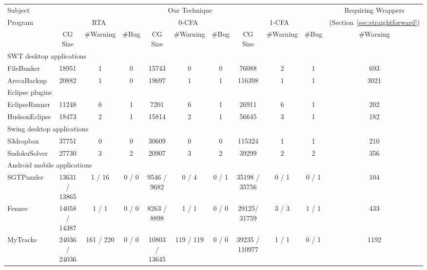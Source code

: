 \begin{table}[ht]
\begin{center}
 \fontsize{9pt}{\baselineskip}\selectfont
\hspace*{-0.2cm}
\setlength{\tabcolsep}{.14\tabcolsep}
\begin{tabular}{|l||c|c|c||c|c|c||c|c|c||c|}
\hline
 Subject&  \multicolumn{9}{|c||}{Our Technique} & Requiring Wrappers  \\
\cline{2-10}
 Program  &  \multicolumn{3}{|c||}{RTA }& \multicolumn{3}{|c||}{0-CFA } & \multicolumn{3}{|c||}{1-CFA } & (Section~\ref{sec:straightforward})  \\
\cline{2-11}
 & CG Size & \#Warning & \#Bug & CG Size & \#Warning & \#Bug & CG Size & \#Warning & \#Bug & \#Warning \\
\hline \hline
\multicolumn{11}{|l|}{SWT desktop applications}   \\
 \hline
 FileBunker &  18951 &  1 &  0 & 15743 & 0 & 0 & 76088 & 2 & 1& 693  \\
 \hline
 ArecaBackup&  20882 &  1  &  0 & 19697 & 1 & 1  & 116398 & 1 & 1 & 3021\\
 \hline
 \hline
\multicolumn{11}{|l|}{Eclipse plugins}   \\
 \hline
 EclipseRunner&  11248&  6 &  1 & 7201 & 6 & 1 & 26911 & 6 & 1& 202  \\
 \hline
 HudsonEclipse& 18473 &  2 &  1 & 15814 & 2 & 1& 56645 & 3 & 1 & 182 \\
 \hline
 \hline
\multicolumn{11}{|l|}{Swing desktop applications}   \\
 \hline
 S3dropbox & 37751 &  0 &  0 & 30609 & 0 & 0 & 115324 & 1 & 1 & 210  \\
 \hline
  SudokuSolver&  27730&  3 &  2 & 20907 & 3 & 2 & 39299 & 2 & 2 & 356  \\
 \hline
 \hline
\multicolumn{11}{|l|}{Android mobile applications}   \\
 \hline
 SGTPuzzler & 13631 / 13865&  1 / 16 &  0 / 0 & 9546 / 9682& 0 / 4& 0 / 1 & 35198 / 35756 & 0 / 1  & 0 / 1& 104 \\
 \hline
 Fennec & 14058 / 14387 &  1 / 1 &  0 / 0 & 8263 / 8898 & 1 / 1 & 0 / 0& 29125/ 31759 & 3 / 3 & 1 / 1& 433 \\
 \hline
 MyTracks & 24036 / 24036 &  161 / 220 & 0 / 0 & 10803 / 13645 & 119 / 119 & 0 / 0 & 39235 / 110977 & 1 / 1 & 0 / 1 & 1192 \\

\end{tabular}
\end{center}
\end{table}
